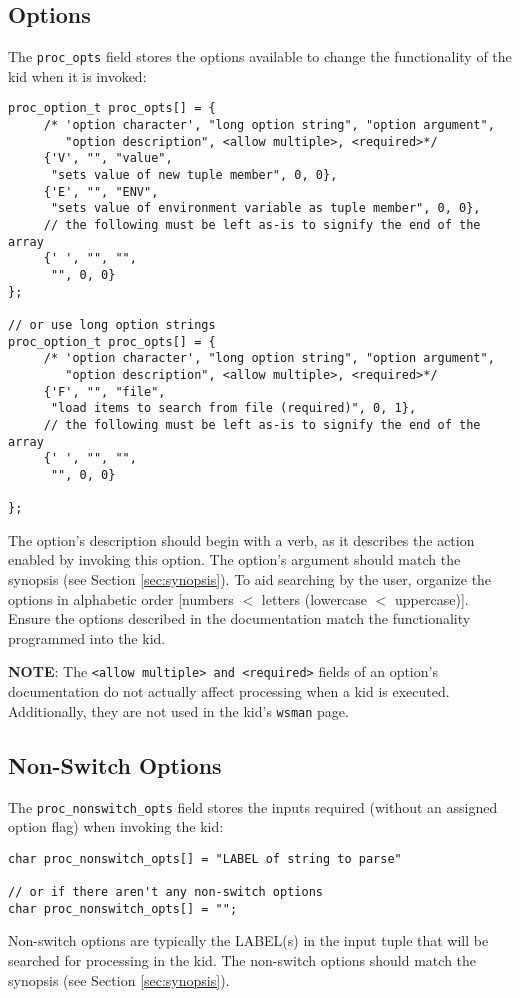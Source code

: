\documentclass[11pt]{article}
\begin{document}
\subsection{Options}\label{sec:options}
The \texttt{proc\_opts} field stores the options available to change the functionality of the kid when it is invoked:
\begin{lstlisting}
proc_option_t proc_opts[] = {
     /* 'option character', "long option string", "option argument",
        "option description", <allow multiple>, <required>*/
     {'V', "", "value",
      "sets value of new tuple member", 0, 0},
     {'E', "", "ENV",
      "sets value of environment variable as tuple member", 0, 0},
     // the following must be left as-is to signify the end of the array
     {' ', "", "",
      "", 0, 0}
};

// or use long option strings
proc_option_t proc_opts[] = {
     /* 'option character', "long option string", "option argument",
        "option description", <allow multiple>, <required>*/
     {'F', "", "file",
      "load items to search from file (required)", 0, 1},
     // the following must be left as-is to signify the end of the array
     {' ', "", "",
      "", 0, 0}

};
\end{lstlisting}
The option's description should begin with a verb, as it describes the action enabled by invoking this option. The
option's argument should match the synopsis (see Section \ref{sec:synopsis}). To aid searching by the user, organize the 
options in alphabetic order [numbers $<$ letters (lowercase $<$ uppercase)]. Ensure the options described in the documentation 
match the functionality programmed into the kid.

\textbf{NOTE}: The \texttt{<allow multiple> and <required>} fields of an option's documentation do not actually affect processing
when a kid is executed. Additionally, they are not used in the kid's \texttt{wsman} page.

\subsection{Non-Switch Options}\label{sec:nsoptions}
The \texttt{proc\_nonswitch\_opts} field stores the inputs required (without an assigned option flag) when invoking the kid:
\begin{lstlisting}
char proc_nonswitch_opts[] = "LABEL of string to parse"

// or if there aren't any non-switch options
char proc_nonswitch_opts[] = "";
\end{lstlisting}
Non-switch options are typically the LABEL(s) in the input tuple that will be searched for processing in the kid. The
non-switch options should match the synopsis (see Section \ref{sec:synopsis}).
\end{document}
